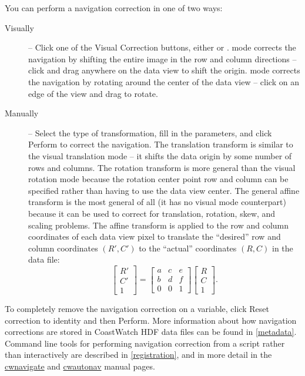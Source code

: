 You can perform a navigation correction in one of two ways:
\begin{description}

\item[Visually] -- Click one of the {\gui Visual Correction} buttons,
either  or
.
 mode corrects the navigation by
shifting the entire image in the row and column directions --
click and drag anywhere on the data view to shift the origin.
 mode corrects the navigation
by rotating around the center of the data view -- click on an
edge of the view and drag to rotate.

\item[Manually] -- Select the type of transformation, fill in the
parameters, and click {\gui Perform} to correct the navigation.
The {\gui translation transform} is similar to the visual
translation mode -- it shifts the data origin by some number of
rows and columns.  The {\gui rotation transform} is more general
than the visual rotation mode because the rotation center point
row and column can be specified rather than having to use the
data view center.  The {\gui general affine transform} is the most
general of all (it has no visual mode counterpart) because it can
be used to correct for translation, rotation, skew, and scaling
problems.  The affine transform is applied to the row and column
coordinates of each data view pixel to translate the ``desired''
row and column coordinates $(R',C')$ to the ``actual''
coordinates $(R,C)$ in the data file:
\[
  \left[ \begin{array}{c}
           R' \\
           C' \\
           1
         \end{array}  
  \right]
  = 
  \left[ \begin{array}{ccc}
           a & c & e \\
           b & d & f \\
           0 & 0 & 1
         \end{array}
  \right]
  \left[ \begin{array}{c}
           R \\
           C \\
           1
         \end{array}
  \right] .
\]
\end{description}
To completely remove the navigation correction on a variable,
click {\gui Reset correction to identity} and then {\gui Perform}.
More information about how navigation corrections
are stored in CoastWatch HDF data files can be found in
\autoref{metadata}.  Command line tools for performing navigation
correction from a script rather than interactively are described
in \autoref{registration}, and in more detail in the
\hyperlink{cwnavigate}{cwnavigate} and
\hyperlink{cwautonav}{cwautonav} manual pages.

